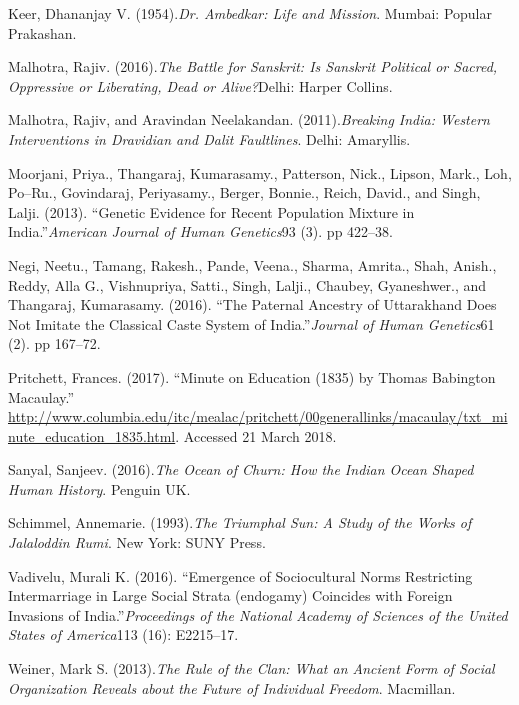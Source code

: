 \begin{thebibliography}{99}
  Keer, Dhananjay V. (1954).\textit{Dr. Ambedkar: Life and Mission}. Mumbai: Popular Prakashan.

  Malhotra, Rajiv. (2016).\textit{The Battle for Sanskrit: Is Sanskrit Political or Sacred, Oppressive or Liberating, Dead or Alive?}Delhi: Harper Collins.

  Malhotra, Rajiv, and Aravindan Neelakandan. (2011).\textit{Breaking India: Western Interventions in Dravidian and Dalit Faultlines}. Delhi: Amaryllis.

  Moorjani, Priya., Thangaraj, Kumarasamy., Patterson, Nick., Lipson, Mark., Loh, Po–Ru., Govindaraj, Periyasamy., Berger, Bonnie., Reich, David., and Singh, Lalji. (2013). “Genetic Evidence for Recent Population Mixture in India.”\textit{American Journal of Human Genetics}93 (3). pp 422–38.

  Negi, Neetu., Tamang, Rakesh., Pande, Veena., Sharma, Amrita., Shah, Anish., Reddy, Alla G., Vishnupriya, Satti., Singh, Lalji., Chaubey, Gyaneshwer., and Thangaraj, Kumarasamy. (2016). “The Paternal Ancestry of Uttarakhand Does Not Imitate the Classical Caste System of India.”\textit{Journal of Human Genetics}61 (2). pp 167–72.

  Pritchett, Frances. (2017). “Minute on Education (1835) by Thomas Babington Macaulay.” \url{http://www.columbia.edu/itc/mealac/pritchett/00generallinks/macaulay/txt_minute_education_1835.html}. Accessed 21 March 2018.

  Sanyal, Sanjeev. (2016).\textit{The Ocean of Churn: How the Indian Ocean Shaped Human History}. Penguin UK.

  Schimmel, Annemarie. (1993).\textit{The Triumphal Sun: A Study of the Works of Jalaloddin Rumi}. New York: SUNY Press.

  Vadivelu, Murali K. (2016). “Emergence of Sociocultural Norms Restricting Intermarriage in Large Social Strata (endogamy) Coincides with Foreign Invasions of India.”\textit{Proceedings of the National Academy of Sciences of the United States of America}113 (16): E2215–17.

  Weiner, Mark S. (2013).\textit{The Rule of the Clan: What an Ancient Form of Social Organization Reveals about the Future of Individual Freedom}. Macmillan.

 \end{thebibliography}

